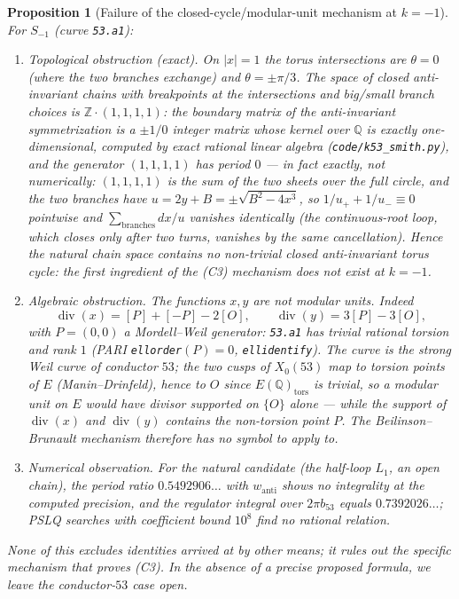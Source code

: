 \documentclass[11pt]{amsart}
\newtheorem{proposition}[theorem]{Proposition}
\theoremstyle{definition}
\theoremstyle{remark}
\newcommand{\Q}{\mathbb{Q}}
\newcommand{\Z}{\mathbb{Z}}
\DeclareMathOperator{\divisor}{div}
\begin{document}
\begin{proposition}[Failure of the closed-cycle/modular-unit mechanism at
$k=-1$]\label{thm:k53}
For $S_{-1}$ (curve \emph{\texttt{53.a1}}):
\begin{enumerate}
  \item \emph{Topological obstruction (exact).} On $|x|=1$ the torus intersections
  are $\theta=0$ (where the two branches \emph{exchange}) and
  $\theta=\pm\pi/3$. The space of closed anti-invariant chains with
  breakpoints at the intersections and big/small branch choices is
  $\Z\cdot(1,1,1,1)$: the boundary matrix of the anti-invariant
  symmetrization is a $\pm1/0$ integer matrix whose kernel over $\Q$ is
  exactly one-dimensional, computed by exact rational linear algebra
  (\texttt{code/k53\_smith.py}), and the generator $(1,1,1,1)$ has period
  $0$ --- in fact exactly, not numerically: $(1,1,1,1)$ is the sum of the
  two sheets over the full circle, and the two branches have
  $u=2y+B=\pm\sqrt{B^2-4x^3}$, so $1/u_++1/u_-\equiv0$ pointwise and
  $\sum_{\mathrm{branches}}dx/u$ vanishes identically (the continuous-root
  loop, which closes only after \emph{two} turns, vanishes by the same
  cancellation). Hence the natural chain space contains
  \emph{no non-trivial closed anti-invariant torus cycle}: the first
  ingredient of the (C3) mechanism does not exist at $k=-1$.
  \item \emph{Algebraic obstruction.} The functions $x,y$ are not modular
  units. Indeed
  \[
    \divisor(x)=[P]+[-P]-2[O],\qquad \divisor(y)=3[P]-3[O],
  \]
  with $P=(0,0)$ a Mordell--Weil \emph{generator}: \texttt{53.a1} has
  trivial rational torsion and rank $1$ (PARI \texttt{ellorder}$(P)=0$,
  \texttt{ellidentify}). The curve is the strong Weil curve of conductor
  $53$; the two cusps of $X_0(53)$ map to torsion points of $E$
  (Manin--Drinfeld), hence to $O$ since $E(\Q)_{\mathrm{tors}}$ is trivial,
  so a modular unit on $E$ would have divisor supported on $\{O\}$ alone ---
  while the support of $\divisor(x)$ and $\divisor(y)$ contains the
  non-torsion point $P$. The Beilinson--Brunault mechanism therefore has no
  symbol to apply to.
  \item \emph{Numerical observation.} For the natural candidate (the
  half-loop $L_1$, an open chain), the period ratio $0.5492906\ldots$ with
  $w_{\mathrm{anti}}$ shows no integrality at the computed precision, and
  the regulator integral over $2\pi b_{53}$ equals $0.7392026\ldots$; PSLQ
  searches with coefficient bound $10^8$ find no rational relation.
\end{enumerate}
None of this excludes identities arrived at by other means; it rules out the
specific mechanism that proves \emph{(C3)}. In the absence of a precise
proposed formula, we leave the conductor-$53$ case open.
\end{proposition}
\end{document}
